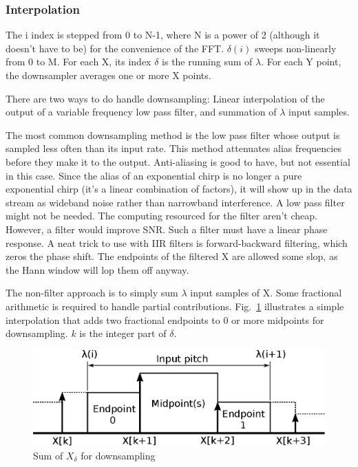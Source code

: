 \subsubsection{Interpolation}

The i index is stepped from 0 to N-1, where N is a power of 2 (although it
doesn't have to be) for the convenience of the FFT. $\delta(i)$ sweeps
non-linearly from 0 to M. For each X, its index $\delta$ is the running sum
of $\lambda$. For each Y point, the downsampler averages one or more X points.

There are two ways to do handle downsampling: Linear interpolation of the output
of a variable frequency low pass filter, and summation of $\lambda$
input samples.

The most common downsampling method is the low pass filter whose output is
sampled less often than its input rate.
This method attenuates alias frequencies before they make it to the output.
Anti-aliasing is good to have, but not essential in this case.
Since the alias of an exponential chirp is no longer a pure exponential
chirp (it's a linear combination of factors), it will show up in the data stream
as wideband noise rather than narrowband interference.
A low pass filter might not be needed.
The computing resourced for the filter aren't cheap.
However, a filter would improve SNR.
Such a filter must have a linear phase response.
A neat trick to use with IIR filters is forward-backward filtering,
which zeros the phase shift.
The endpoints of the filtered X are allowed some slop,
as the Hann window will lop them off anyway.

The non-filter approach is to simply sum $\lambda$ input samples of X.
Some fractional arithmetic is required to handle partial contributions.
Fig.~\ref{fig:xint} illustrates a simple interpolation that adds two fractional
endpoints to 0 or more midpoints for downsampling.
$k$ is the integer part of $\delta$.

\begin{figure}
	\centering
	\includegraphics[width=0.95\linewidth]{../source/xint_e}
	\caption[X interpolation]{Sum of $X_\delta$ for downsampling}
	\label{fig:xint}
\end{figure}

